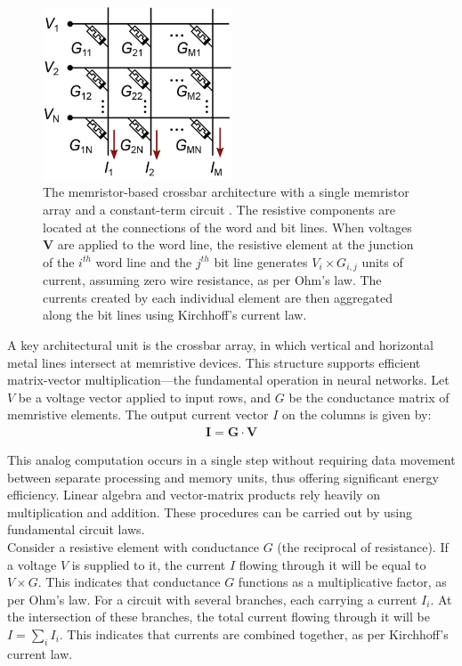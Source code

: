 \begin{figure}[htbp!] 
    \centering    
    \includegraphics[width=0.5\textwidth]{Chapter2/Figs/h.png}
    \caption[The memristor-based crossbar architecture.]{The memristor-based crossbar architecture with a single memristor array and a constant-term circuit \cite{truong2014new}. The resistive components are located at the connections of the word and bit lines. When voltages $\mathbf{V}$ are applied to the word line, the resistive element at the junction of the $i^{th}$ word line and the $j^{th}$ bit line generates $V_i \times G_{i,j}$ units of current, assuming zero wire resistance, as per Ohm's law. The currents created by each individual element are then aggregated along the bit lines using Kirchhoff's current law.}
    \label{fig:2h}
\end{figure}
    

\noindent A key architectural unit is the crossbar array, in which vertical and horizontal metal lines intersect at memristive devices. This structure supports efficient matrix-vector multiplication—the fundamental operation in neural networks. Let $V$ be a voltage vector applied to input rows, and $G$ be the conductance matrix of memristive elements. The output current vector $I$ on the columns is given by:
\begin{align}
    \mathbf{I} = \mathbf{G} \cdot \mathbf{V} \label{eq:2.30}
\end{align}

\noindent This analog computation occurs in a single step without requiring data movement between separate processing and memory units, thus offering significant energy efficiency. Linear algebra and vector-matrix products rely heavily on multiplication and addition. These procedures can be carried out by using fundamental circuit laws. \\

\noindent Consider a resistive element with conductance $G$ (the reciprocal of resistance). If a voltage $V$ is supplied to it, the current $I$ flowing through it will be equal to $V \times G$. This indicates that conductance $G$ functions as a multiplicative factor, as per Ohm's law. For a circuit with several branches, each carrying a current $I_i$. At the intersection of these branches, the total current flowing through it will be $I = \sum_{i}^{} I_i$. This indicates that currents are combined together, as per Kirchhoff's current law. \\

